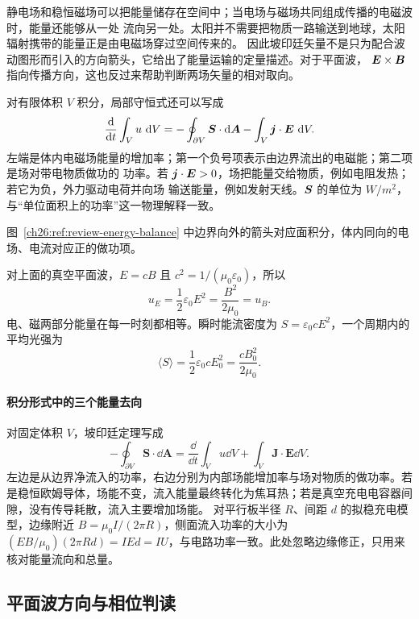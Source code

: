 {静电场和稳恒磁场可以把能量储存在空间中；当电场与磁场共同组成传播的电磁波时，能量还能够从一处
流向另一处。太阳并不需要把物质一路输送到地球，太阳辐射携带的能量正是由电磁场穿过空间传来的。
因此坡印廷矢量不是只为配合波动图形而引入的方向箭头，它给出了能量运输的定量描述。对于平面波，
$\bm{E}\times\bm{B}$ 指向传播方向，这也反过来帮助判断两场矢量的相对取向。

对有限体积 $V$ 积分，局部守恒式还可以写成
\begin{equation}
  \frac{\mathop{}\!\mathrm d}{\mathop{}\!\mathrm d t}\int_Vu\,\mathop{}\!\mathrm d V
  =-\oint_{\partial V}\bm{S}\cdot\mathop{}\!\mathrm d\bm{A}-
  \int_V\bm{j}\cdot\bm{E}\,\mathop{}\!\mathrm d V.
\end{equation}
左端是体内电磁场能量的增加率；第一个负号项表示由边界流出的电磁能；第二项是场对带电物质做功的
功率。若 $\bm{j}\cdot\bm{E}>0$，场把能量交给物质，例如电阻发热；若它为负，外力驱动电荷并向场
输送能量，例如发射天线。$\bm{S}$ 的单位为 $\si{W/m^2}$，与“单位面积上的功率”这一物理解释一致。

图~\ref{ch26:ref:review-energy-balance} 中边界向外的箭头对应面积分，体内同向的电场、电流对应正的做功项。

\poyntingBalanceDiagram

对上面的真空平面波，$E=cB$ 且 $c^2=1/(\mu_0\varepsilon_0)$，所以
\begin{equation}
  u_E=\frac12\varepsilon_0E^2
  =\frac{B^2}{2\mu_0}=u_B.
\end{equation}
电、磁两部分能量在每一时刻都相等。瞬时能流密度为 $S=\varepsilon_0cE^2$，一个周期内的平均光强为
\begin{equation}
  \boxed{\langle S\rangle=\frac12\varepsilon_0cE_0^2
  =\frac{cB_0^2}{2\mu_0}}.
\end{equation}


\paragraph{积分形式中的三个能量去向}
对固定体积 $V$，坡印廷定理写成
\[
 -\oint_{\partial V}\boldsymbol S\cdot\dd\boldsymbol A
 =\frac{\dd}{\dd t}\int_Vu\dd V+\int_V\boldsymbol J\cdot\boldsymbol E\dd V.
\]
左边是从边界净流入的功率，右边分别为内部场能增加率与场对物质的做功率。若是稳恒欧姆导体，场能不变，流入能量最终转化为焦耳热；若是真空充电电容器间隙，没有传导耗散，流入主要增加场能。
对平行板半径 $R$、间距 $d$ 的拟稳充电模型，边缘附近 $B=\mu_0I/(2\pi R)$，侧面流入功率的大小为
$(EB/\mu_0)(2\pi Rd)=IEd=IU$，与电路功率一致。此处忽略边缘修正，只用来核对能量流向和总量。


\subsection{平面波方向与相位判读}


}
